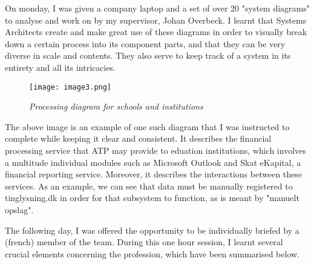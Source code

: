 On monday, I was given a company laptop and a set of over 20 "system diagrams" to analyse and work on by my supervisor, Johan Overbeck. I learnt that Systems Architects create and make great use of these diagrams in order to visually break down a certain process into its component parts, and that they can be very diverse in scale and contents. They also serve to keep track of a system in its entirety and all its intricacies. 



\begin{figure}[H]
    \centering
        \texttt{[image: image3.png]}
        \caption*{\textit{Processing diagram for schools and institutions}}
\end{figure}

The above image is an example of one such diagram that I was instructed to complete while keeping it clear and consistent. It describes the financial processing service that ATP may provide to eduation institutions, which involves a multitude individual modules such as Microsoft Outlook and Skat eKapital, a financial reporting service. Moreover, it describes the interactions between these services. As an example, we can see that data must be manually registered to tinglysning.dk in order for that subsystem to function, as is meant by "manuelt opslag".

The following day, I was offered the opportunity to be individually briefed by a (french) member of the team. During this one hour session, I learnt several crucial elements concerning the profession, which have been summarised below.

